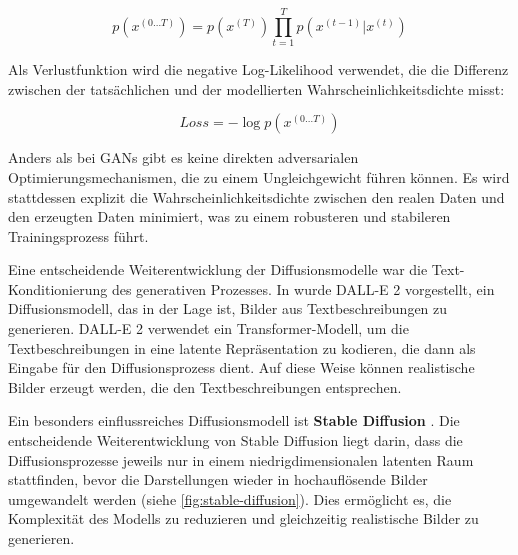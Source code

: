 \begin{equation}
	p \left( x^{(0 \dots T)} \right) = p \left(x^{(T)}\right)\prod_{t=1}^T p \left(x^{(t-1)}|x^{(t)}\right)
	\label{eq:reverse-diffusion}
\end{equation}

Als Verlustfunktion wird die negative Log-Likelihood verwendet, die die Differenz zwischen der tatsächlichen und der modellierten Wahrscheinlichkeitsdichte misst:

\begin{equation}
	Loss = -\log p \left( x^{(0 \dots T)} \right)
	\label{eq:loss-diffusion}
\end{equation}

Anders als bei GANs gibt es keine direkten adversarialen Optimierungsmechanismen, die zu einem Ungleichgewicht führen können. Es wird stattdessen explizit die Wahrscheinlichkeitsdichte zwischen den realen Daten und den erzeugten Daten minimiert, was zu einem robusteren und stabileren Trainingsprozess führt.

Eine entscheidende Weiterentwicklung der Diffusionsmodelle war die Text-Konditionierung des generativen Prozesses. In \parencite{Ramesh2022dalle2} wurde DALL-E 2 vorgestellt, ein Diffusionsmodell, das in der Lage ist, Bilder aus Textbeschreibungen zu generieren. DALL-E 2 verwendet ein Transformer-Modell, um die Textbeschreibungen in eine latente Repräsentation zu kodieren, die dann als Eingabe für den Diffusionsprozess dient. Auf diese Weise können realistische Bilder erzeugt werden, die den Textbeschreibungen entsprechen. %

Ein besonders einflussreiches Diffusionsmodell ist \textbf{Stable Diffusion} \parencite{Rombach2022stablediffusion}. Die entscheidende Weiterentwicklung von Stable Diffusion liegt darin, dass die Diffusionsprozesse jeweils nur in einem niedrigdimensionalen latenten Raum stattfinden, bevor die Darstellungen wieder in hochauflösende Bilder umgewandelt werden (siehe \autoref{fig:stable-diffusion}). Dies ermöglicht es, die Komplexität des Modells zu reduzieren und gleichzeitig realistische Bilder zu generieren.

